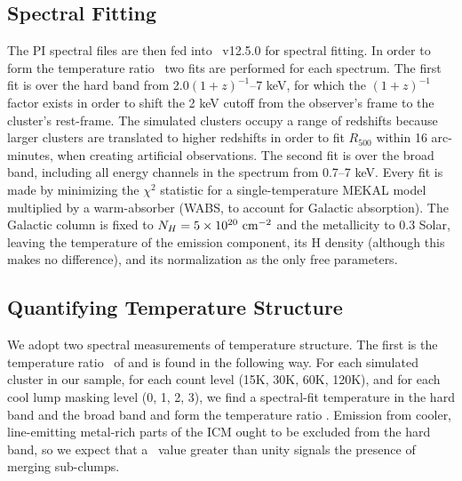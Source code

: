 \documentclass[12pt,preprint]{aastex}
\begin{document}
\subsection{Spectral Fitting}

The PI spectral files are then fed into \xspec\ v12.5.0 for spectral
fitting.  In order to form the temperature ratio \thbr\ two fits are
performed for each spectrum.  The first fit is over the hard band from
2.0$(1+z)^{-1}$--7 keV, for which the $(1+z)^{-1}$ factor exists in
order to shift the 2 keV cutoff from the observer's frame to the
cluster's rest-frame. The simulated clusters occupy a range of
redshifts because larger clusters are translated to higher redshifts
in order to fit $R_{500}$ within 16 arc-minutes, when creating
artificial observations.  The second fit is over the broad band,
including all energy channels in the spectrum from 0.7--7 keV.  Every
fit is made by minimizing the $\chi^2$ statistic for a
single-temperature MEKAL model multiplied by a warm-absorber (WABS, to
account for Galactic absorption).  The Galactic column is fixed to
$N_H = 5 \times 10^{20}\ {\rm cm}^{-2}$ and the metallicity to 0.3
Solar, leaving the temperature of the emission component, its H
density (although this makes no difference), and its normalization as
the only free parameters.

\subsection{Quantifying Temperature Structure}
\label{sec:coolresid}

We adopt two spectral measurements of temperature structure.  The
first is the temperature ratio \thbr\ of
\cite{cavagnolo_bandpass_2008} and is found in the following way.  For
each simulated cluster in our sample, for each count level (15K, 30K,
60K, 120K), and for each cool lump masking level (0, 1, 2, 3), we find
a spectral-fit temperature in the hard band and the broad band and
form the temperature ratio \thbr.  Emission from cooler, line-emitting
metal-rich parts of the ICM ought to be excluded from the hard band,
so we expect that a \thbr\ value greater than unity signals the
presence of merging sub-clumps.
\end{document}
